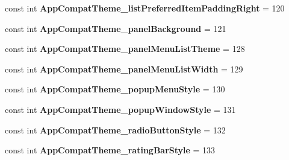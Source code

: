 \begin{DoxyCompactItemize}
\item 
\mbox{\label{classst_delivery_1_1_resource_1_1_styleable_a89089db30f82904cfbc0ef9a02c6317c}} 
const int {\bfseries App\+Compat\+Theme\+\_\+list\+Preferred\+Item\+Padding\+Right} = 120
\item 
\mbox{\label{classst_delivery_1_1_resource_1_1_styleable_afbef23d036ef8d1569b9b25446d20937}} 
const int {\bfseries App\+Compat\+Theme\+\_\+panel\+Background} = 121
\item 
\mbox{\label{classst_delivery_1_1_resource_1_1_styleable_ad0e8d65022629b5c797686ad9e2f516c}} 
const int {\bfseries App\+Compat\+Theme\+\_\+panel\+Menu\+List\+Theme} = 128
\item 
\mbox{\label{classst_delivery_1_1_resource_1_1_styleable_a4b9cdb7ef197572ac316d7adced4d673}} 
const int {\bfseries App\+Compat\+Theme\+\_\+panel\+Menu\+List\+Width} = 129
\item 
\mbox{\label{classst_delivery_1_1_resource_1_1_styleable_a206192918e0243afa544f5a819358df6}} 
const int {\bfseries App\+Compat\+Theme\+\_\+popup\+Menu\+Style} = 130
\item 
\mbox{\label{classst_delivery_1_1_resource_1_1_styleable_aa3845c3bfcce292c8759691772f41cd9}} 
const int {\bfseries App\+Compat\+Theme\+\_\+popup\+Window\+Style} = 131
\item 
\mbox{\label{classst_delivery_1_1_resource_1_1_styleable_a533777364bcdb27296fb5fd113b6cd8d}} 
const int {\bfseries App\+Compat\+Theme\+\_\+radio\+Button\+Style} = 132
\item 
\mbox{\label{classst_delivery_1_1_resource_1_1_styleable_a581c9a25bee795208ce885585b40a8b1}} 
const int {\bfseries App\+Compat\+Theme\+\_\+rating\+Bar\+Style} = 133
\item 
\mbox{\label{classst_delivery_1_1_resource_1_1_styleable_a1ec5282847b3d7f258b8698e91dab457}} 

\end{DoxyCompactItemize}
